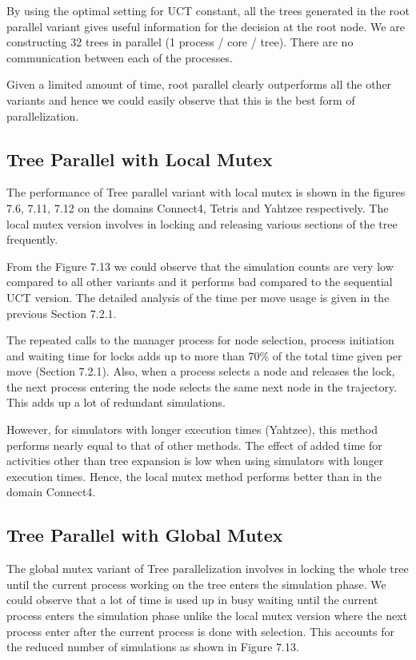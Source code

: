 \documentclass[double,12pt]{beavtex}
\begin{document}
By using the optimal setting for UCT constant, all the trees generated in the root parallel variant gives useful information for the decision at the root node. We are constructing 32 trees in parallel (1 process / core / tree). There are no communication between each of the processes. 

Given a limited amount of time, root parallel clearly outperforms all the other variants and hence we could easily observe that this is the best form of parallelization.

\subsection{Tree Parallel with Local Mutex}
The performance of Tree parallel variant with local mutex is shown in the figures 7.6, 7.11, 7.12 on the domains Connect4, Tetris and Yahtzee respectively. The local mutex version involves in locking and releasing various sections of the tree frequently. 

From the Figure 7.13 we could observe that the simulation counts are very low compared to all other variants and it performs bad compared to the sequential UCT version. The detailed analysis of the time per move usage is given in the previous Section 7.2.1. 

The repeated calls to the manager process for node selection, process initiation and waiting time for locks adds up to more than 70\% of the total time given per move (Section 7.2.1). Also, when a process selects a node and releases the lock, the next process entering the node selects the same next node in the trajectory. This adds up a lot of redundant simulations. 

However, for simulators with longer execution times (Yahtzee), this method performs nearly equal to that of other methods. The effect of added time for activities other than tree expansion is low when using simulators with longer execution times. Hence, the local mutex method performs better than in the domain Connect4.

\subsection{Tree Parallel with Global Mutex}
The global mutex variant of Tree parallelization involves in locking the whole tree until the current process working on the tree enters the simulation phase. We could observe that a lot of time is used up in busy waiting until the current process enters the simulation phase unlike the local mutex version where the next process enter after the current process is done with selection. This accounts for the reduced number of simulations as shown in Figure 7.13. 
\end{document}
